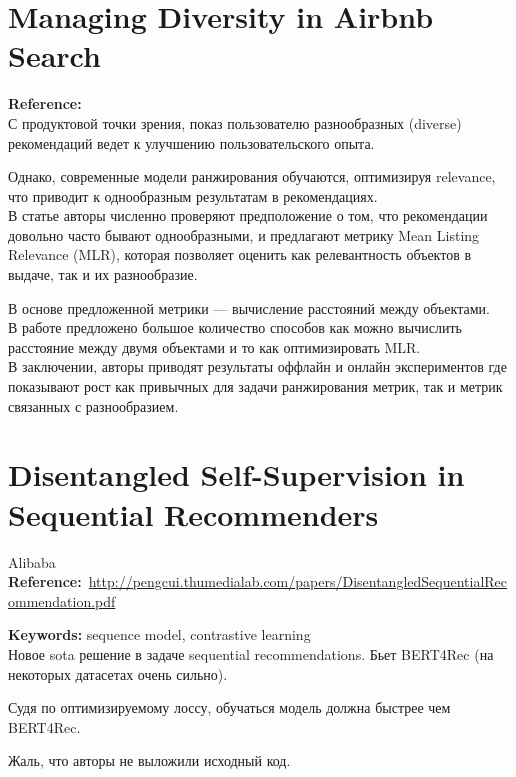 \begin{bibunit}[plainnat]
\section*{Managing Diversity in Airbnb Search}

\textbf{Reference:}~\cite{abdool2020managing} \\

С продуктовой точки зрения, показ пользователю разнообразных (diverse) рекомендаций ведет к улучшению пользовательского опыта.

Однако, современные модели ранжирования обучаются, оптимизируя relevance, что приводит к однообразным результатам в рекомендациях. \\

В статье авторы численно проверяют предположение о том, что рекомендации довольно часто бывают однообразными, и предлагают метрику Mean Listing Relevance (MLR), которая позволяет оценить как релевантность объектов в выдаче, так и их разнообразие. 

В основе предложенной метрики --- вычисление расстояний между объектами. \\

В работе предложено большое количество способов как можно вычислить расстояние между двумя объектами и то как оптимизировать MLR. \\

В заключении, авторы приводят результаты оффлайн и онлайн экспериментов где показывают рост как привычных для задачи ранжирования метрик, так и метрик связанных с разнообразием.

\section*{Disentangled Self-Supervision in Sequential Recommenders}

Alibaba \\

\textbf{Reference:}~\url{http://pengcui.thumedialab.com/papers/DisentangledSequentialRecommendation.pdf}

\textbf{Keywords:} sequence model, contrastive learning \\

Новое sota решение в задаче sequential recommendations. Бьет BERT4Rec (на некоторых датасетах очень сильно).

Судя по оптимизируемому лоссу, обучаться модель должна быстрее чем BERT4Rec.

Жаль, что авторы не выложили исходный код.

\end{bibunit}
